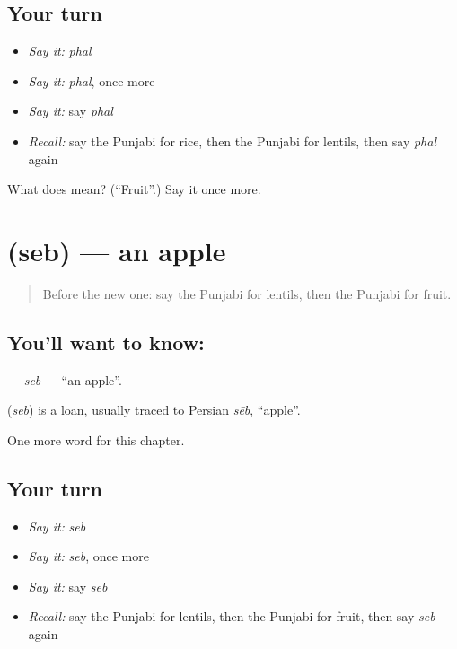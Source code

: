 \subsection*{Your turn}
\begin{itemize}
\raggedright
  \item \emph{Say it:} \emph{phal}
  \item \emph{Say it:} \emph{phal}, once more
  \item \emph{Say it:} say \emph{phal}
  \item \emph{Recall:} say the Punjabi for rice, then the Punjabi for lentils, then say \emph{phal} again
\end{itemize}

\begin{tcolorbox}[breakable,colback=teal!4,colframe=teal!35!black,title={Before you move on}]
What does  mean? (\textquotedblleft{}Fruit\textquotedblright{}.) Say it once more.
\end{tcolorbox}
\section[\texorpdfstring{\pa{ਸੇਬ} (seb)}{ਸੇਬ (seb)}]{ (seb) — an apple}

\label{lesson:PA-C64-seb}



\begin{quote}
Before the new one: say the Punjabi for lentils, then the Punjabi for fruit.
\end{quote}

\subsection*{You'll want to know: }
\textbf{} — \emph{seb} — \textquotedblleft{}an apple\textquotedblright{}.

\begin{cousinweb}
\textbf{} (\emph{seb}) is a loan, usually traced to Persian \emph{sēb}, \textquotedblleft{}apple\textquotedblright{}.
\end{cousinweb}

\begin{grammarlens}[title={What you've built}]
One more word for this chapter.
\end{grammarlens}

\subsection*{Your turn}
\begin{itemize}
\raggedright
  \item \emph{Say it:} \emph{seb}
  \item \emph{Say it:} \emph{seb}, once more
  \item \emph{Say it:} say \emph{seb}
  \item \emph{Recall:} say the Punjabi for lentils, then the Punjabi for fruit, then say \emph{seb} again
\end{itemize}

